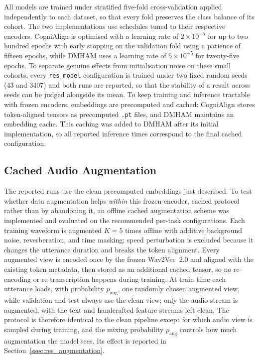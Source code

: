 \documentclass[a4paper,12pt]{article}
\begin{document}
All models are trained under stratified five-fold cross-validation applied independently to each dataset, so that every fold preserves the class balance of its cohort. The two implementations use schedules tuned to their respective encoders. CogniAlign is optimised with a learning rate of $2\times10^{-5}$ for up to two hundred epochs with early stopping on the validation fold using a patience of fifteen epochs, while DMHAM uses a learning rate of $5\times10^{-5}$ for twenty-five epochs. To separate genuine effects from initialisation noise on these small cohorts, every \texttt{res\_model} configuration is trained under two fixed random seeds (43 and 3407) and both runs are reported, so that the stability of a result across seeds can be judged alongside its mean. To keep training and inference tractable with frozen encoders, embeddings are precomputed and cached: CogniAlign stores token-aligned tensors as precomputed \texttt{.pt} files, and DMHAM maintains an embedding cache. This caching was added to DMHAM after its initial implementation, so all reported inference times correspond to the final cached configuration.

\subsection{Cached Audio Augmentation}
\label{ssec:augmentation}

The reported runs use the clean precomputed embeddings just described. To test whether data augmentation helps \emph{within} this frozen-encoder, cached protocol rather than by abandoning it, an offline cached augmentation scheme was implemented and evaluated on the recommended per-task configurations. Each training waveform is augmented $K=5$ times offline with additive background noise, reverberation, and time masking; speed perturbation is excluded because it changes the utterance duration and breaks the token alignment. Every augmented view is encoded once by the frozen Wav2Vec~2.0 and aligned with the existing token metadata, then stored as an additional cached tensor, so no re-encoding or re-transcription happens during training. At train time each utterance loads, with probability $p_{\mathrm{aug}}$, one randomly chosen augmented view, while validation and test always use the clean view; only the audio stream is augmented, with the text and handcrafted-feature streams left clean. The protocol is therefore identical to the clean pipeline except for which audio view is sampled during training, and the mixing probability $p_{\mathrm{aug}}$ controls how much augmentation the model sees. Its effect is reported in Section~\ref{ssec:res_augmentation}.
\end{document}

